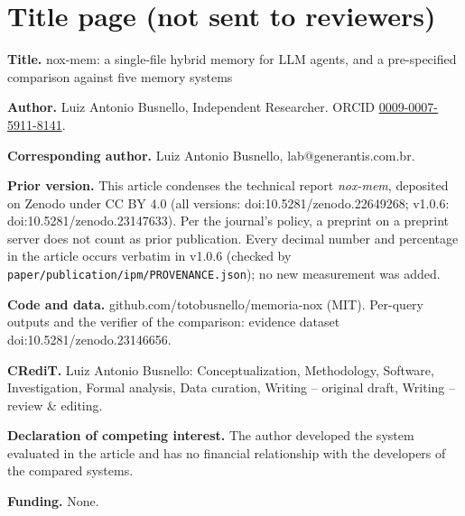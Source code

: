 \documentclass[a4paper,11pt]{article}
\begin{document}
\section{Title page (not sent to reviewers)}

\textbf{Title.} nox-mem: a single-file hybrid memory for LLM agents, and a pre-specified comparison against five memory systems

\textbf{Author.} Luiz Antonio Busnello, Independent Researcher. ORCID \href{https://orcid.org/0009-0007-5911-8141}{0009-0007-5911-8141}.

\textbf{Corresponding author.} Luiz Antonio Busnello, lab@generantis.com.br.

\textbf{Prior version.} This article condenses the technical report \emph{nox-mem}, deposited on Zenodo under CC BY 4.0
(all versions: doi:10.5281/zenodo.22649268; v1.0.6: doi:10.5281/zenodo.23147633). Per the journal's
policy, a preprint on a preprint server does not count as prior publication. Every decimal number and
percentage in the article occurs verbatim in v1.0.6 (checked by \texttt{paper/publication/ipm/PROVENANCE.json});
no new measurement was added.

\textbf{Code and data.} github.com/totobusnello/memoria-nox (MIT). Per-query outputs and the verifier of the
comparison: evidence dataset doi:10.5281/zenodo.23146656.

\textbf{CRediT.} Luiz Antonio Busnello: Conceptualization, Methodology, Software, Investigation, Formal analysis,
Data curation, Writing -- original draft, Writing -- review \& editing.

\textbf{Declaration of competing interest.} The author developed the system evaluated in the article and has no
financial relationship with the developers of the compared systems.

\textbf{Funding.} None.
\end{document}
